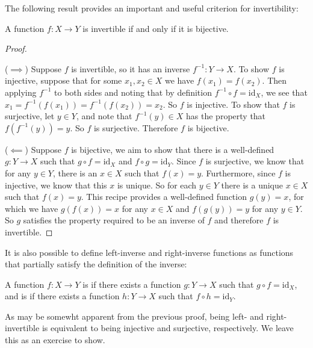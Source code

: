 The following result provides an important and useful criterion for invertibility:

\begin{theorem}
A function $f:X \to Y$ is invertible if and only if it is bijective.
\end{theorem}

\begin{proof} \

($\implies$) Suppose $f$ is invertible, so it has an inverse $f^{-1}: Y \to X$. To show $f$ is injective, suppose that for some $x_1, x_2 \in X$ we have $f(x_1) = f(x_2)$. Then applying $f^{-1}$ to both sides and noting that by definition $f^{-1} \circ f = \mathrm{id}_X$, we see that $x_1 = f^{-1}(f(x_1)) = f^{-1}(f(x_2)) = x_2$. So $f$ is injective. To show that $f$ is surjective, let $y \in Y$, and note that $f^{-1}(y) \in X$ has the property that $f(f^{-1}(y)) = y$. So $f$ is surjective. Therefore $f$ is bijective.

($\impliedby$) Suppose $f$ is bijective, we aim to show that there is a well-defined $g:Y \to X$ such that $g \circ f = \mathrm{id}_X$ and $f \circ g = \mathrm{id}_Y$. Since $f$ is surjective, we know that for any $y \in Y$, there is an $x \in X$ such that $f(x) = y$. Furthermore, since $f$ is injective, we know that this $x$ is unique. So for each $y \in Y$ there is a unique $x \in X$ such that $f(x) = y$. This recipe provides a well-defined function $g(y) = x$, for which we have $g(f(x)) = x$ for any $x \in X$ and $f(g(y)) = y$ for any $y \in Y$. So $g$ satisfies the property required to be an inverse of $f$ and therefore $f$ is invertible.
\end{proof}

It is also possible to define left-inverse and right-inverse functions as functions that partially satisfy the definition of the inverse:

\begin{definition}
A function $f:X \to Y$ is  if there exists a function $g:Y \to X$ such that $g \circ f = \mathrm{id}_X$, and is  if there exists a function $h: Y \to X$ such that $f \circ h = \mathrm{id}_Y$.
\end{definition}

As may be somewht apparent from the previous proof, being left- and right-invertible is equivalent to being injective and surjective, respectively. We leave this as an exercise to show.
\pagebreak

